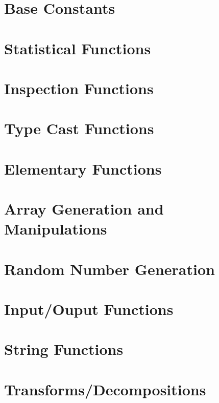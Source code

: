 \documentclass{book}
\begin{document}
\section{Base Constants}





\section{Statistical Functions}


\section{Inspection Functions}








\section{Type Cast Functions}










\section{Elementary Functions}











\section{Array Generation and Manipulations}





\section{Random Number Generation}



\section{Input/Ouput Functions}















\section{String Functions}

\section{Transforms/Decompositions}



\end{document}
